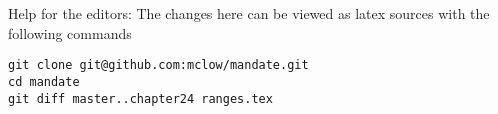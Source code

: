 

\vfill
Help for the editors: The changes here can be viewed as latex sources with the following commands
\begin{verbatim}
git clone git@github.com:mclow/mandate.git
cd mandate
git diff master..chapter24 ranges.tex
\end{verbatim}
